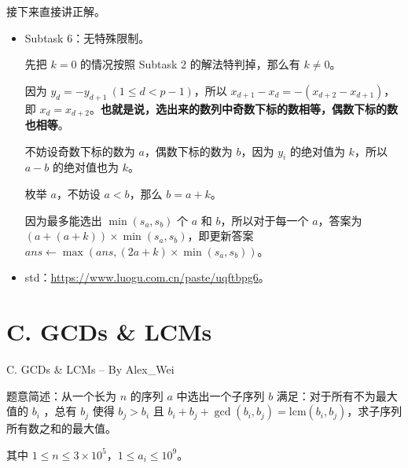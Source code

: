 \documentclass[10pt,aspectratio=43,mathserif]{beamer}
\begin{document}
\begin{frame} \setlength{\parskip}{0.4\baselineskip}

	接下来直接讲正解。

	\begin{itemize} \setlength{\parskip}{0.4\baselineskip}

		\item Subtask 6：无特殊限制。

		先把 $k=0$ 的情况按照 Subtask 2 的解法特判掉，那么有 $k\neq 0$。

		因为 $y_d=-y_{d+1}\ (1\leq d<p-1)$，所以 $x_{d+1}-x_d=-(x_{d+2}-x_{d+1})$，即 $x_d=x_{d+2}$。\textbf{也就是说，选出来的数列中奇数下标的数相等，偶数下标的数也相等}。

		不妨设奇数下标的数为 $a$，偶数下标的数为 $b$，因为 $y_i$ 的绝对值为 $k$，所以 $a-b$ 的绝对值也为 $k$。

		枚举 $a$，不妨设 $a<b$，那么 $b=a+k$。

		因为最多能选出 $\min(s_a,s_b)$ 个 $a$ 和 $b$，所以对于每一个 $a$，答案为 $(a+(a+k))\times \min(s_a,s_b)$，即更新答案 $ans\gets\max(ans,(2a+k)\times \min(s_a,s_b))$。

		\item std：\url{https://www.luogu.com.cn/paste/uqftbpg6}。

	\end{itemize}

\end{frame}


\section{C. GCDs \& LCMs}

\begin{frame} \setlength{\parskip}{0.4\baselineskip}

    {\large C. GCDs \& LCMs -- By Alex\_Wei}

    题意简述：从一个长为 $n$ 的序列 $a$ 中选出一个子序列 $b$ 满足：对于所有不为最大值的 $b_i$ ，总有 $b_j$ 使得 $b_j>b_i$ 且 $b_i+b_j+\gcd(b_i,b_j)=\mathrm{lcm}(b_i,b_j)$，求子序列所有数之和的最大值。

    其中 $1\leq n\leq 3\times 10^5$，$1\leq a_i\leq 10^9$。

\end{frame}
\end{document}
